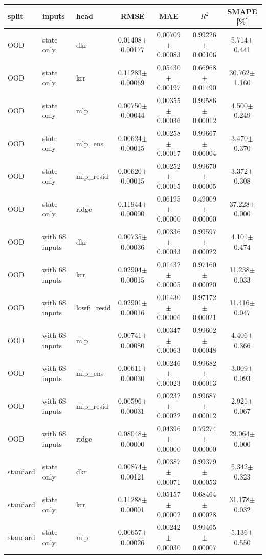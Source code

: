 \begin{tabular}{lllcccc}
\toprule
split & inputs & head & RMSE & MAE & $R^2$ & SMAPE [\%] \\
\midrule
OOD & state only & dkr & 0.01408$\pm$0.00177 & 0.00709$\pm$0.00083 & 0.99226$\pm$0.00106 & 5.714$\pm$0.441 \\
OOD & state only & krr & 0.11283$\pm$0.00069 & 0.05430$\pm$0.00197 & 0.66968$\pm$0.01490 & 30.762$\pm$1.160 \\
OOD & state only & mlp & 0.00750$\pm$0.00044 & 0.00355$\pm$0.00036 & 0.99586$\pm$0.00012 & 4.500$\pm$0.249 \\
OOD & state only & mlp\_ens & 0.00624$\pm$0.00015 & 0.00258$\pm$0.00017 & 0.99667$\pm$0.00004 & 3.470$\pm$0.370 \\
OOD & state only & mlp\_resid & 0.00620$\pm$0.00015 & 0.00252$\pm$0.00015 & 0.99670$\pm$0.00005 & 3.372$\pm$0.308 \\
OOD & state only & ridge & 0.11944$\pm$0.00000 & 0.06195$\pm$0.00000 & 0.49009$\pm$0.00000 & 37.228$\pm$0.000 \\
OOD & with 6S inputs & dkr & 0.00735$\pm$0.00036 & 0.00336$\pm$0.00033 & 0.99597$\pm$0.00022 & 4.101$\pm$0.474 \\
OOD & with 6S inputs & krr & 0.02904$\pm$0.00015 & 0.01432$\pm$0.00005 & 0.97160$\pm$0.00020 & 11.238$\pm$0.033 \\
OOD & with 6S inputs & lowfi\_resid & 0.02901$\pm$0.00016 & 0.01430$\pm$0.00006 & 0.97172$\pm$0.00021 & 11.416$\pm$0.047 \\
OOD & with 6S inputs & mlp & 0.00741$\pm$0.00080 & 0.00347$\pm$0.00063 & 0.99602$\pm$0.00048 & 4.406$\pm$0.366 \\
OOD & with 6S inputs & mlp\_ens & 0.00611$\pm$0.00030 & 0.00246$\pm$0.00023 & 0.99682$\pm$0.00013 & 3.009$\pm$0.093 \\
OOD & with 6S inputs & mlp\_resid & 0.00596$\pm$0.00031 & 0.00232$\pm$0.00022 & 0.99687$\pm$0.00012 & 2.921$\pm$0.067 \\
OOD & with 6S inputs & ridge & 0.08048$\pm$0.00000 & 0.04396$\pm$0.00000 & 0.79274$\pm$0.00000 & 29.064$\pm$0.000 \\
standard & state only & dkr & 0.00874$\pm$0.00121 & 0.00387$\pm$0.00071 & 0.99379$\pm$0.00053 & 5.342$\pm$0.323 \\
standard & state only & krr & 0.11288$\pm$0.00001 & 0.05157$\pm$0.00002 & 0.68464$\pm$0.00028 & 31.178$\pm$0.032 \\
standard & state only & mlp & 0.00657$\pm$0.00026 & 0.00242$\pm$0.00030 & 0.99465$\pm$0.00007 & 5.136$\pm$0.550 \\

\end{tabular}
